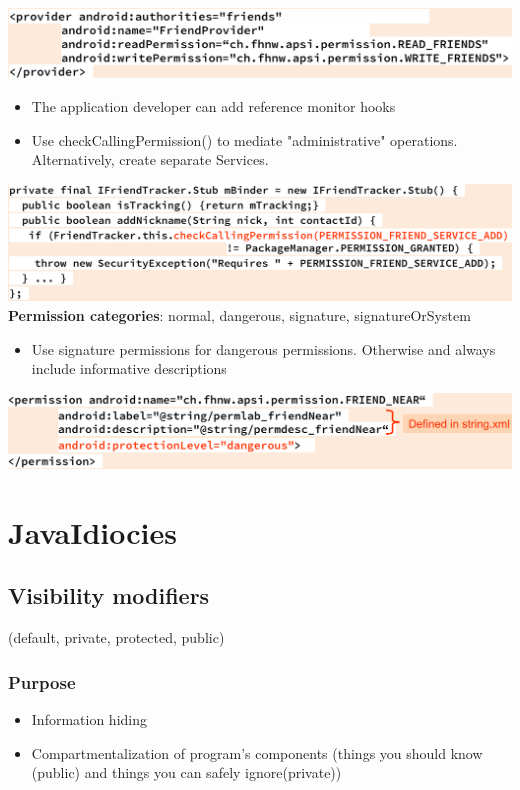 \documentclass[10pt]{article}
\begin{document}
\includegraphics[scale=0.4]{content_prov_perm.png}
\begin{itemize}
	\item The application developer can add reference monitor hooks
	\item Use checkCallingPermission() to mediate "administrative" operations. Alternatively, create separate Services.
\end{itemize}
\includegraphics[scale=0.4]{service_hooks.png}
\textbf{Permission categories}: normal, dangerous, signature, signatureOrSystem
\begin{itemize}
	\item Use signature permissions for dangerous permissions. Otherwise and always include informative descriptions
\end{itemize}
\includegraphics[scale=0.4]{perm_categ.png}

\newpage
\section{JavaIdiocies}
\subsection{Visibility modifiers}
(default, private, protected, public)
\subsubsection{Purpose}
\begin{itemize}
	\item Information hiding
	\item Compartmentalization of program's components (things you should know (public) and things you can safely ignore(private))
\end{itemize}
\end{document}
